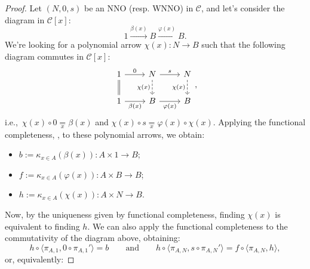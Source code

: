 \begin{proof}
    Let $(N,0,s)$ be an NNO (resp. WNNO) in $\mathcal{C}$, and let's consider the diagram in $\mathcal{C}[x]$:
    \[ 1 \xrightarrow{\beta(x)} B \xrightarrow{\varphi(x)} B. \]
    We're looking for a polynomial arrow $\chi(x) : N \to B$ such that the following diagram commutes in $\mathcal{C}[x]$:
    \[\begin{tikzcd}
        1 & N & N \\
        1 & B & B
        \arrow["0", from=1-1, to=1-2]
        \arrow[shift right = 0.20ex, no head, from=1-1, to=2-1]
        \arrow[shift left = 0.20ex, no head, from=1-1, to=2-1]
        \arrow["s", from=1-2, to=1-3]
        \arrow["{\chi(x)}"', dashed, from=1-2, to=2-2]
        \arrow["{\chi(x)}"', dashed, from=1-3, to=2-3]
        \arrow["{\beta(x)}"', from=2-1, to=2-2]
        \arrow["{\varphi(x)}"', from=2-2, to=2-3]
    \end{tikzcd},\]
    i.e.,\ $\chi(x) \circ 0 \underset{x}{=} \beta(x)$ and $\chi(x) \circ s \underset{x}{=} \varphi(x) \circ \chi(x)$. Applying the functional completeness, , to these polynomial arrows, we obtain:
    \begin{itemize}
        \item $b := \kappa_{x \in A}(\beta(x)) : A \times 1 \to B$;
        \item $f := \kappa_{x \in A}(\varphi(x)) : A \times B \to B$;
        \item $h := \kappa_{x \in A}(\chi(x)) : A \times N \to B$.
    \end{itemize}
    Now, by the uniqueness given by functional completeness, finding $\chi(x)$ is equivalent to finding $h$. We can also apply the functional completeness
    to the commutativity of the diagram above, obtaining:
    \[ h \circ \langle \pi_{A,1}, 0 \circ \pi_{A,1}' \rangle = b \qquad \text{and} \qquad h \circ \langle \pi_{A,N}, s \circ \pi_{A,N}' \rangle = f \circ \langle \pi_{A,N}, h \rangle, \]
    or, equivalently:

\end{proof}

